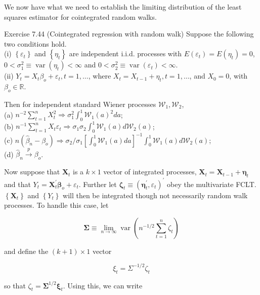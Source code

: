 \documentclass[10pt]{article}
\begin{document}
We now have what we need to establish the limiting distribution of the least squares estimator for cointegrated random walks.

Exercise 7.44 (Cointegrated regression with random walk) Suppose the following two conditions hold.\\
(i) $\left\{\varepsilon_{t}\right\}$ and $\left\{\eta_{t}\right\}$ are independent i.i.d. processes with $E\left(\varepsilon_{t}\right)=E\left(\eta_{t}\right)=0$, $0<\sigma_{1}^{2} \equiv \operatorname{var}\left(\eta_{t}\right)<\infty$ and $0<\sigma_{2}^{2} \equiv \operatorname{var}\left(\varepsilon_{t}\right)<\infty$.\\
(ii) $Y_{t}=X_{t} \beta_{o}+\varepsilon_{t}, t=1, \ldots$, where $X_{t}=X_{t-1}+\eta_{t}, t=1, \ldots$, and $X_{0}=0$, with $\beta_{o} \in \mathbb{R}$.

Then for independent standard Wiener processes $\mathcal{W}_{1}, \mathcal{W}_{2}$,\\
(a) $n^{-2} \sum_{t=1}^{n} X_{t}^{2} \Rightarrow \sigma_{1}^{2} \int_{0}^{1} \mathcal{W}_{1}(a)^{2} d a$;\\
(b) $n^{-1} \sum_{t=1}^{n} X_{t} \varepsilon_{t} \Rightarrow \sigma_{1} \sigma_{2} \int_{0}^{1} \mathcal{W}_{1}(a) d \mathcal{W}_{2}(a)$;\\
(c) $n\left(\hat{\beta}_{n}-\beta_{o}\right) \Rightarrow \sigma_{2} / \sigma_{1}\left[\int_{0}^{1} \mathcal{W}_{1}(a) d a\right]^{-1} \int_{0}^{1} \mathcal{W}_{1}(a) d \mathcal{W}_{2}(a)$;\\
(d) $\hat{\beta}_{n} \xrightarrow{p} \beta_{o}$.

Now suppose that $\mathbf{X}_{t}$ is a $k \times 1$ vector of integrated processes, $\mathbf{X}_{t}= \mathbf{X}_{t-1}+\boldsymbol{\eta}_{t}$ and that $Y_{t}=\mathbf{X}_{t}^{\prime} \boldsymbol{\beta}_{o}+\varepsilon_{t}$. Further let $\boldsymbol{\zeta}_{t} \equiv\left(\boldsymbol{\eta}_{t}^{\prime}, \varepsilon_{t}\right)^{\prime}$ obey the multivariate FCLT. $\left\{\mathbf{X}_{t}\right\}$ and $\left\{Y_{t}\right\}$ will then be integrated though not necessarily random walk processes. To handle this case, let

$$
\boldsymbol{\Sigma} \equiv \lim _{n \rightarrow \infty} \operatorname{var}\left(n^{-1 / 2} \sum_{t=1}^{n} \zeta_{t}\right)
$$

and define the $(k+1) \times 1$ vector

$$
\xi_{t}=\Sigma^{-1 / 2} \zeta_{t}
$$

so that $\zeta_{t}=\boldsymbol{\Sigma}^{1 / 2} \boldsymbol{\xi}_{t}$. Using this, we can write
\end{document}
